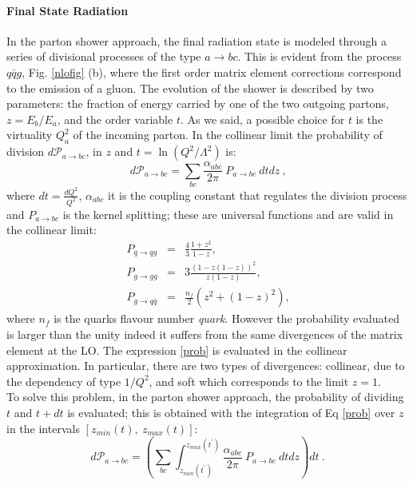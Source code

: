 \paragraph{Final State Radiation}
In the parton shower approach, the final radiation state is modeled through a series of divisional processes of the type $ a \rightarrow bc $.   
This is evident from the process $q \bar{q}g$, Fig. \ref{nlofig} (b), where the first order matrix element  corrections  correspond to the emission of a gluon. 
The evolution of the shower is described by two parameters: the fraction of energy carried by one of the two outgoing partons, $ z = E_b / E_a $, and the order variable $ t $. As we said, a possible choice for $ t $ is the  virtuality $ Q_a^2 $ of the incoming parton.
In the  collinear limit the probability of division $d \mathcal{P}_{a \rightarrow bc}$, in  $z$ and $t=\ln(Q^2/\Lambda^2)$ is:
\begin{equation}
 d \mathcal{P}_{a \rightarrow bc}= \sum_{bc} \frac{\alpha_{abc}}{2 \pi}\: {P}_{a \rightarrow bc} \:dt dz  \: \mbox{,} \label{prob}  \end{equation}
where $dt=\frac{d Q^2}{Q^2}$, $\alpha_{abc}$ it is the coupling constant that regulates the division process and  ${P}_{a \rightarrow bc}$ is the kernel splitting; these are universal functions and are valid in the collinear limit:
\begin{eqnarray}
P_{q \rightarrow qg    }&=& \frac{4}{3} \frac{1+z^2}{1-z} \mbox{,} \nonumber \\ 
 P_{g \rightarrow gg }&=& 3 \frac{(1-z(1-z))^2}{z(1-z)}    \mbox{,} \\ 
P_{g \rightarrow q\bar{q} }&=& \frac{n_f}{2} (z^2+ (1-z)^2)   \mbox{,} \nonumber \end{eqnarray}
where $n_f$ is the quarks flavour number \textit{quark}.
However the probability  evaluated is larger than the unity indeed it suffers from the same divergences of the matrix element at the LO. 
The expression \ref{prob} is evaluated in the collinear approximation. 
In particular, there are two types of divergences: collinear, due to the dependency of type $ 1 / Q^2 $, and soft which corresponds to the limit $ z = 1 $. \\
To solve this problem, in the parton shower approach, the probability of dividing $ t $ and $ t + dt $ is evaluated; this is obtained with the integration of Eq \ref{prob} over  $z$ in the intervals  $[z_{min}(t), \: z_{max}(t)]$:
\begin{equation}
 d \mathcal{P}_{a \rightarrow bc}= \left( \sum_{bc} \int_{z_{min}(t^{'})}^{{z_{max}(t^{'})}}  \frac{\alpha_{abc}}{2 \pi}\: {P}_{a \rightarrow bc} \:dt dz \right) dt  \: \mbox{.}   \end{equation}
